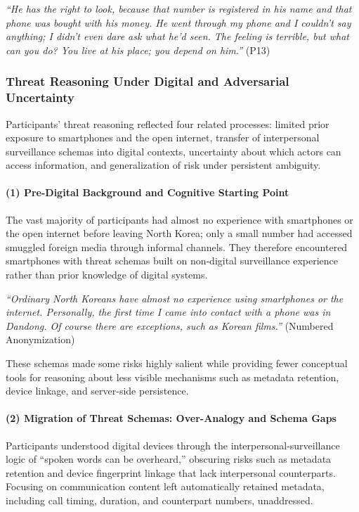 \documentclass[conference,compsoc]{IEEEtran}
\begin{document}
\begin{displayquote}
\textit{``He has the right to look, because that number is registered in his name and that phone was bought with his money. He went through my phone and I couldn't say anything; I didn't even dare ask what he'd seen. The feeling is terrible, but what can you do? You live at his place; you depend on him.''} (P13)
\end{displayquote}

\subsubsection{Threat Reasoning Under Digital and Adversarial Uncertainty}
\label{subsubsec:threat-reasoning}

Participants' threat reasoning reflected four related processes: limited prior exposure to smartphones and the open internet, transfer of interpersonal surveillance schemas into digital contexts, uncertainty about which actors can access information, and generalization of risk under persistent ambiguity.

\paragraph{\textbf{(1) Pre-Digital Background and Cognitive Starting Point}}
The vast majority of participants had almost no experience with smartphones or the open internet before leaving North Korea; only a small number had accessed smuggled foreign media through informal channels. They therefore encountered smartphones with threat schemas built on non-digital surveillance experience rather than prior knowledge of digital systems.

\begin{displayquote}
\textit{``Ordinary North Koreans have almost no experience using smartphones or the internet. Personally, the first time I came into contact with a phone was in Dandong. Of course there are exceptions, such as Korean films.''} (Numbered Anonymization)
\end{displayquote}

These schemas made some risks highly salient while providing fewer conceptual tools for reasoning about less visible mechanisms such as metadata retention, device linkage, and server-side persistence.

\paragraph{\textbf{(2) Migration of Threat Schemas: Over-Analogy and Schema Gaps}}
Participants understood digital devices through the interpersonal-surveillance logic of ``spoken words can be overheard,'' obscuring risks such as metadata retention and device fingerprint linkage that lack interpersonal counterparts. Focusing on communication content left automatically retained metadata, including call timing, duration, and counterpart numbers, unaddressed.
\end{document}

